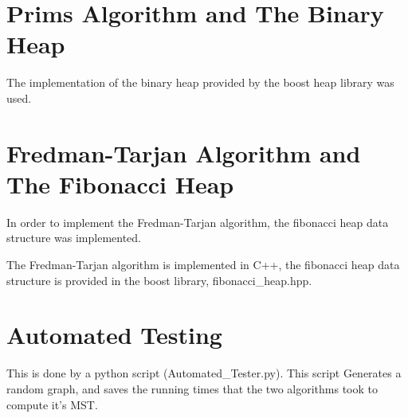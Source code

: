 \documentclass[]{article}
\begin{document}
\section{Prims Algorithm and The Binary Heap}
\begin{flushleft}
	The implementation of the binary heap provided by the boost heap library was used.
	  
\end{flushleft} 

\section{Fredman-Tarjan Algorithm and The Fibonacci Heap}
\begin{flushleft}
	In order to implement the Fredman-Tarjan algorithm, the fibonacci heap data structure was implemented.
	
	

	The Fredman-Tarjan algorithm is implemented in C++, the fibonacci heap data structure is provided in the boost library, fibonacci\_heap.hpp.  
\end{flushleft} 

\section{Automated Testing}
\begin{flushleft}
	This is done by a python script (Automated\_Tester.py).
	This script Generates a random graph, and saves the running times that the two algorithms took to compute it's MST.   
\end{flushleft}
\end{document}
